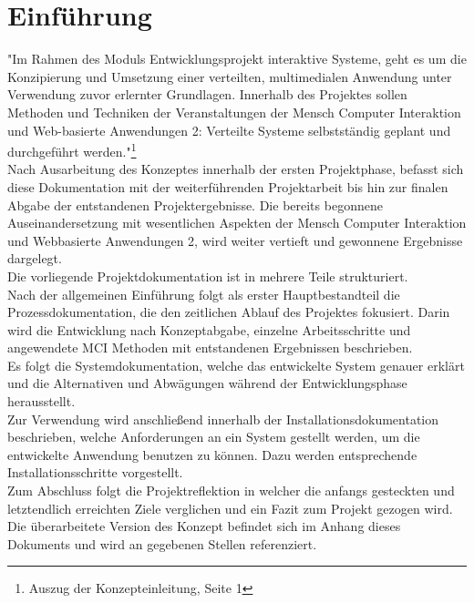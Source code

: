 
\chapter{Einführung}
"Im Rahmen des Moduls Entwicklungsprojekt interaktive Systeme, geht es um die Konzipierung und Umsetzung einer verteilten, multimedialen Anwendung unter Verwendung zuvor erlernter Grundlagen. Innerhalb des Projektes sollen Methoden und Techniken der Veranstaltungen der Mensch Computer Interaktion und Web-basierte Anwendungen 2: Verteilte Systeme selbstständig geplant und durchgeführt werden."\footnote{Auszug der Konzepteinleitung, Seite 1}\\

Nach Ausarbeitung des Konzeptes innerhalb der ersten Projektphase, befasst sich diese Dokumentation mit der weiterführenden Projektarbeit bis hin zur finalen Abgabe der entstandenen Projektergebnisse. Die bereits begonnene Auseinandersetzung mit wesentlichen Aspekten der Mensch Computer Interaktion und Webbasierte Anwendungen 2, wird weiter vertieft und gewonnene Ergebnisse dargelegt.\\

Die vorliegende Projektdokumentation ist in mehrere Teile strukturiert.\\
Nach der allgemeinen Einführung folgt als erster Hauptbestandteil die Prozessdokumentation, die den zeitlichen Ablauf des Projektes fokusiert. 
Darin wird die Entwicklung nach Konzeptabgabe, einzelne Arbeitsschritte und angewendete MCI Methoden mit entstandenen Ergebnissen beschrieben.\\ Es folgt die Systemdokumentation, welche das entwickelte System genauer erklärt und die Alternativen und Abwägungen während der Entwicklungsphase herausstellt.\\ 
Zur Verwendung wird anschließend innerhalb der Installationsdokumentation beschrieben, welche Anforderungen an ein System gestellt werden, um die entwickelte Anwendung benutzen zu können. Dazu werden entsprechende Installationsschritte vorgestellt.\\
Zum Abschluss folgt die Projektreflektion in welcher die anfangs gesteckten und letztendlich erreichten Ziele verglichen und ein Fazit zum Projekt gezogen wird.\\

Die überarbeitete Version des Konzept befindet sich im Anhang dieses Dokuments und wird an gegebenen Stellen referenziert.


